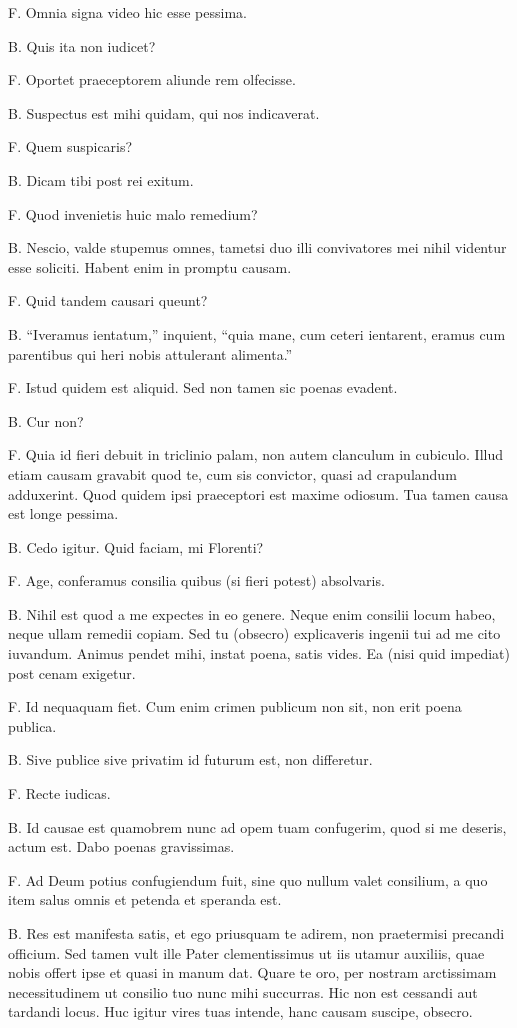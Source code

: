 \documentclass{article}
\begin{document}
F. Omnia signa video hic esse pessima.

B. Quis ita non iudicet?

F. Oportet praeceptorem aliunde rem olfecisse.

B. Suspectus est mihi quidam, qui nos indicaverat.

F. Quem suspicaris?

B. Dicam tibi post rei exitum.

F. Quod invenietis huic malo remedium?

B. Nescio, valde stupemus omnes, tametsi duo illi convivatores mei nihil videntur esse soliciti. Habent enim in promptu causam.

F. Quid tandem causari queunt?

B. ``Iveramus ientatum,'' inquient, ``quia mane, cum ceteri ientarent, eramus cum parentibus qui heri nobis attulerant alimenta.''

F. Istud quidem est aliquid. Sed non tamen sic poenas evadent.

B. Cur non?

F. Quia id fieri debuit in triclinio palam, non autem clanculum in cubiculo. Illud etiam causam gravabit quod te, cum sis convictor, quasi ad crapulandum adduxerint. Quod quidem ipsi praeceptori est maxime odiosum. Tua tamen causa est longe pessima.

B. Cedo igitur. Quid faciam, mi Florenti?

F. Age, conferamus consilia quibus (si fieri potest) absolvaris.

B. Nihil est quod a me expectes in eo genere. Neque enim consilii locum habeo, neque ullam remedii copiam. Sed tu (obsecro) explicaveris ingenii tui ad me cito iuvandum. Animus pendet mihi, instat poena, satis vides. Ea (nisi quid impediat) post cenam exigetur.

F. Id nequaquam fiet. Cum enim crimen publicum non sit, non erit poena publica.

B. Sive publice sive privatim id futurum est, non differetur.

F. Recte iudicas.

B. Id causae est quamobrem nunc ad opem tuam confugerim, quod si me deseris, actum est. Dabo poenas gravissimas.

F. Ad Deum potius confugiendum fuit, sine quo nullum valet consilium, a quo item salus omnis et petenda et speranda est.

B. Res est manifesta satis, et ego priusquam te adirem, non praetermisi precandi officium. Sed tamen vult ille Pater clementissimus ut iis utamur auxiliis, quae nobis offert ipse et quasi in manum dat. Quare te oro, per nostram arctissimam necessitudinem ut consilio tuo nunc mihi succurras. Hic non est cessandi aut tardandi locus. Huc igitur vires tuas intende, hanc causam suscipe, obsecro.
\end{document}
